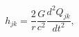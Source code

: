 \begin{equation}
h_{jk}=\frac{2}{r}\frac{G}{c^{2}}\frac{d^{2}Q_{jk}}{dt^{2}},  \label{63}
\end{equation}


